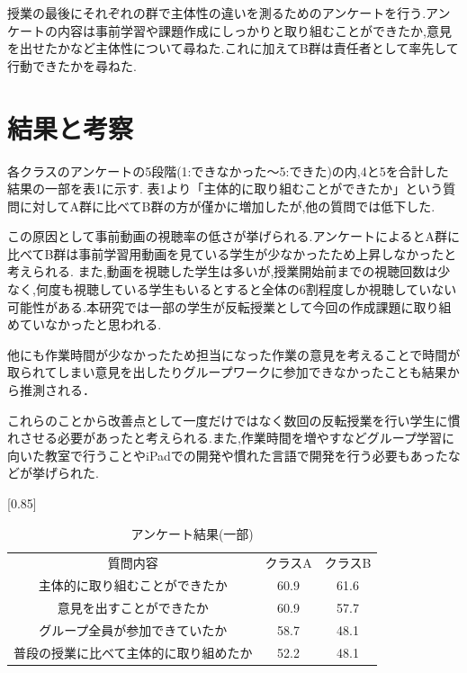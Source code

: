 \documentclass[twocolumn,10pt,a4j]{jsarticle}
\begin{document}
授業の最後にそれぞれの群で主体性の違いを測るためのアンケートを行う.アンケートの内容は事前学習や課題作成にしっかりと取り組むことができたか,意見を出せたかなど主体性について尋ねた.これに加えてB群は責任者として率先して行動できたかを尋ねた.


\section{結果と考察}
各クラスのアンケートの5段階(1:できなかった〜5:できた)の内,4と5を合計した結果の一部を表1に示す.
表1より「主体的に取り組むことができたか」という質問に対してA群に比べてB群の方が僅かに増加したが,他の質問では低下した.

この原因として事前動画の視聴率の低さが挙げられる.アンケートによるとA群に比べてB群は事前学習用動画を見ている学生が少なかったため上昇しなかったと考えられる.
また,動画を視聴した学生は多いが,授業開始前までの視聴回数は少なく,何度も視聴している学生もいるとすると全体の6割程度しか視聴していない可能性がある.本研究では一部の学生が反転授業として今回の作成課題に取り組めていなかったと思われる.

他にも作業時間が少なかったため担当になった作業の意見を考えることで時間が取られてしまい意見を出したりグループワークに参加できなかったことも結果から推測される．

これらのことから改善点として一度だけではなく数回の反転授業を行い学生に慣れさせる必要があったと考えられる.また,作業時間を増やすなどグループ学習に向いた教室で行うことやiPadでの開発や慣れた言語で開発を行う必要もあったなどが挙げられた.\newline

\begin{table}[!hbt]
\begin{center}
\caption{アンケート結果(一部)}
\label{my-label}
\scalebox{0.85}[0.85]{
\begin{tabular}{|c|c|c|}
\cline{1-3}
 質問内容 & クラスA & クラスB \\ \cline{1-3}  
主体的に取り組むことができたか & 60.9 & 61.6 \\ \cline{1-3}  
 意見を出すことができたか & 60.9 & 57.7 \\ \cline{1-3}  
グループ全員が参加できていたか & 58.7 & 48.1 \\ \cline{1-3}  
普段の授業に比べて主体的に取り組めたか & 52.2 & 48.1 \\ \cline{1-3}  

\end{tabular}
}
\end{center}
\end{table}
\end{document}
